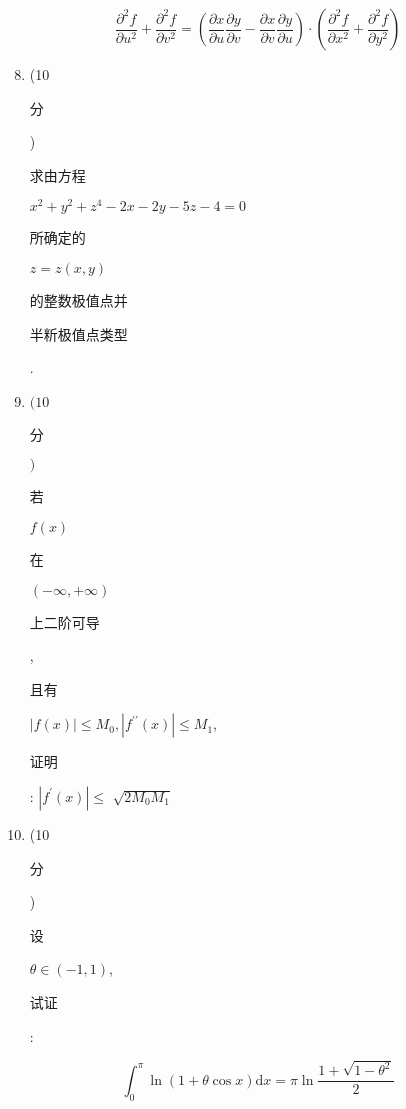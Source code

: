 \documentclass[10pt]{article}
\begin{document}
\begin{enumerate}
\end{enumerate}
$$
\frac{\partial^{2} f}{\partial u^{2}}+\frac{\partial^{2} f}{\partial v^{2}}=\left(\frac{\partial x}{\partial u} \frac{\partial y}{\partial v}-\frac{\partial x}{\partial v} \frac{\partial y}{\partial u}\right) \cdot\left(\frac{\partial^{2} f}{\partial x^{2}}+\frac{\partial^{2} f}{\partial y^{2}}\right)
$$

\begin{enumerate}
  \setcounter{enumi}{7}
  \item (10 \begin{CJK}{UTF8}{mj}分\end{CJK}) \begin{CJK}{UTF8}{mj}求由方程\end{CJK} $x^{2}+y^{2}+z^{4}-2 x-2 y-5 z-4=0$ \begin{CJK}{UTF8}{mj}所确定的\end{CJK} $z=z(x, y)$ \begin{CJK}{UTF8}{mj}的整数极值点并\end{CJK} \begin{CJK}{UTF8}{mj}半䉼极值点类型\end{CJK}.

  \item $(10$ \begin{CJK}{UTF8}{mj}分\end{CJK} $)$ \begin{CJK}{UTF8}{mj}若\end{CJK} $f(x)$ \begin{CJK}{UTF8}{mj}在\end{CJK} $(-\infty,+\infty)$ \begin{CJK}{UTF8}{mj}上二阶可导\end{CJK}, \begin{CJK}{UTF8}{mj}且有\end{CJK} $|f(x)| \leq M_{0},\left|f^{\prime \prime}(x)\right| \leq M_{1}$, \begin{CJK}{UTF8}{mj}证明\end{CJK}: $\left|f^{\prime}(x)\right| \leq$ $\sqrt{2 M_{0} M_{1}}$

  \item (10 \begin{CJK}{UTF8}{mj}分\end{CJK}) \begin{CJK}{UTF8}{mj}设\end{CJK} $\theta \in(-1,1)$, \begin{CJK}{UTF8}{mj}试证\end{CJK}:

\end{enumerate}
$$
\int_{0}^{\pi} \ln (1+\theta \cos x) \mathrm{d} x=\pi \ln \frac{1+\sqrt{1-\theta^{2}}}{2}
$$
\end{document}
